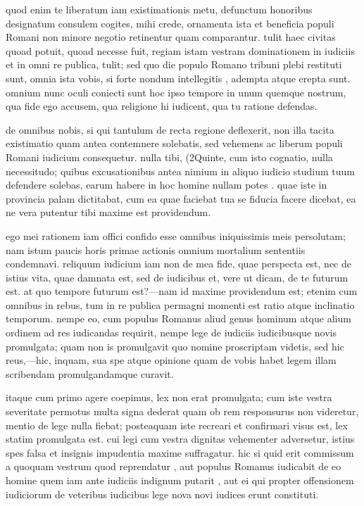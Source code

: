  quod enim te liberatum iam existimationis metu, defunctum honoribus designatum consulem cogites, mihi crede, ornamenta ista et beneficia populi Romani non minore negotio retinentur quam comparantur. tulit haec civitas quoad potuit, quoad necesse fuit, regiam istam vestram dominationem in iudiciis et in omni re publica, tulit; sed quo die populo Romano tribuni plebi restituti sunt, omnia ista vobis, si forte nondum intellegitis , adempta atque erepta sunt. omnium nunc oculi coniecti sunt hoc ipso tempore in unum quemque nostrum, qua fide ego accusem, qua religione hi iudicent, qua tu ratione defendas.

 de omnibus nobis, si qui tantulum de recta regione deflexerit, non illa tacita existimatio quam antea contemnere solebatis, sed vehemens ac liberum populi Romani iudicium consequetur. nulla tibi, (2Quinte, cum isto cognatio, nulla necessitudo; quibus excusationibus antea nimium in aliquo iudicio studium tuum defendere solebas, earum habere in hoc homine nullam potes . quae iste in provincia palam dictitabat, cum ea quae faciebat tua se fiducia facere dicebat, ea ne vera putentur tibi maxime est providendum.

 ego mei rationem iam offici confido esse omnibus iniquissimis meis persolutam; nam istum paucis horis primae actionis omnium mortalium sententiis condemnavi. reliquum iudicium iam non de mea fide, quae perspecta est, nec de istius vita, quae damnata est, sed de iudicibus et, vere ut dicam, de te futurum est. at quo tempore futurum est?—nam id maxime providendum est; etenim cum omnibus in rebus, tum in re publica permagni momenti est ratio atque inclinatio temporum. nempe eo, cum populus Romanus aliud genus hominum atque alium ordinem ad res iudicandas requirit, nempe lege de iudiciis iudicibusque novis promulgata; quam non is promulgavit quo nomine proscriptam videtis, sed hic reus,—hic, inquam, sua spe atque opinione quam de vobis habet legem illam scribendam promulgandamque curavit.

 itaque cum primo agere coepimus, lex non erat promulgata; cum iste vestra severitate permotus multa signa dederat quam ob rem responsurus non videretur, mentio de lege nulla fiebat; posteaquam iste recreari et confirmari visus est, lex statim promulgata est. cui legi cum vestra dignitas vehementer adversetur, istius spes falsa et insignis impudentia maxime suffragatur. hic si quid erit commissum a quoquam vestrum quod reprendatur , aut populus Romanus iudicabit de eo homine quem iam ante iudiciis indignum putarit , aut ei qui propter offensionem iudiciorum de veteribus iudicibus lege nova novi iudices erunt constituti.

